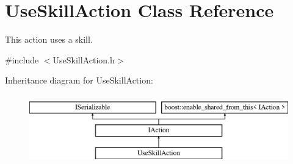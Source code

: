 \hypertarget{class_use_skill_action}{}\section{Use\+Skill\+Action Class Reference}
\label{class_use_skill_action}


This action uses a skill.  




{\ttfamily \#include $<$Use\+Skill\+Action.\+h$>$}

Inheritance diagram for Use\+Skill\+Action\+:\begin{figure}[H]
\begin{center}
\leavevmode
\includegraphics[height=3.000000cm]{class_use_skill_action}
\end{center}
\end{figure}
